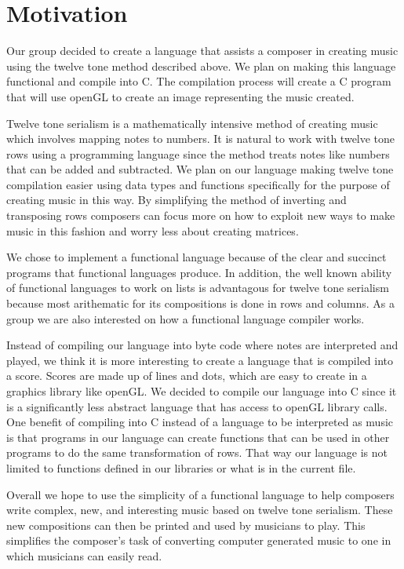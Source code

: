 \section{Motivation}

Our group decided to create a language that assists a composer in creating music 
using the twelve tone method described above. We plan on making this language 
functional and compile into C. The compilation process will create a C program 
that will use openGL to create an image representing the music created. 

Twelve tone serialism is a mathematically intensive method of creating music which 
involves mapping notes to numbers. It is natural to work with twelve tone rows 
using a programming language since the method treats notes like numbers that 
can be added and subtracted. We plan on our language making twelve tone compilation 
easier using data types and functions specifically for the purpose of creating music in 
this way. By simplifying the method of inverting and transposing rows composers can focus 
more on how to exploit new ways to make music in this fashion and worry less about 
creating matrices. 

We chose to implement a functional language because of the clear and 
succinct programs that functional languages produce. In addition, the well known ability
of functional languages to work on lists is advantagous for twelve tone serialism because
most arithematic for its compositions is done in rows and columns. As a group we are also 
interested on how a functional language compiler works. 

Instead of compiling our language into byte code where notes are interpreted and 
played, we think it is more interesting to create a language that is compiled 
into a score. Scores are made up of lines and dots, which are easy to create in 
a graphics library like openGL. We decided to compile our language into C since it is a 
significantly less abstract language that has access to openGL library calls. One benefit 
of compiling into C instead of a language to be interpreted as music is that programs in our 
language can create functions that can be used in other programs to do the same 
transformation of rows. That way our language is not limited to functions defined in 
our libraries or what is in the current file. 

Overall we hope to use the simplicity of a functional language to help composers write 
complex, new, and interesting music based on twelve tone serialism. These new compositions 
can then be printed and used by musicians to play. This simplifies the composer's task of 
converting computer generated music to one in which musicians can easily read. 
